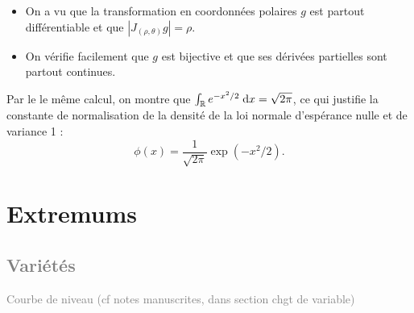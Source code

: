 \proof
\begin{itemize}
  \item On a vu que la transformation en coordonnées polaires $g$ est partout différentiable et que $|J_{(\rho, \theta)}g| = \rho$.
  \item On vérifie facilement que $g$ est bijective et que ses dérivées partielles sont partout continues.
\end{itemize}
\eproof


\remark
Par le le même calcul, on montre que $\int_{\mathbb{R}} e^{-x^2/2} \; \text{d} x = \sqrt{2 \pi}$, ce qui justifie la constante de normalisation de la densité de la loi normale d'espérance nulle et de variance 1 : 
$$
\phi(x) = \frac1{\sqrt{2\pi}} \exp(- x^2/2).
$$

\section{Extremums}

\subsection{\textcolor{gray}{Variétés}}

\textcolor{gray}{Courbe de niveau (cf notes manuscrites, dans section chgt de variable)}

